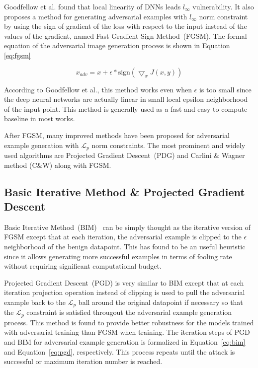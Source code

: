 Goodfellow et al.\cite{goodfellow2014explaining} found that local linearity of DNNs leads \(l_\infty\) vulnerability. It also proposes a method for generating adversarial examples with \(l_\infty\) norm constraint by using the sign of gradient of the loss with respect to the input instead of the values of the gradient, named Fast Gradient Sign Method~(FGSM). The formal equation of the adversarial image generation process is shown in Equation \ref{eq:fgsm}

\begin{equation}
    \label{eq:fgsm}
    x_{adv} = x + \epsilon * \text{sign}(\bigtriangledown_{x}J(x,y))
\end{equation}

According to Goodfellow et al., this method works even when \(\epsilon\) is too small since the deep neural networks are actually linear in small local epsilon neighborhood of the input point. This method is generally used as a fast and easy to compute baseline in most works.

After FGSM, many improved methods have been proposed for adversarial example generation with \(\mathcal{L}_p\) norm constraints. The most prominent and widely used algorithms are Projected Gradient Descent~(PDG) and Carlini \& Wagner method (C\&W) along with FGSM.

\subsection{Basic Iterative Method \& Projected Gradient Descent}
Basic Iterative Method~(BIM)~\cite{kurakin2018adversarialphys} can be simply thought as the iterative version of FGSM except that at each iteration, the adversarial example is clipped to the \(\epsilon\) neighborhood of the benign datapoint. This has found to be an useful heuristic since it allows generating more successful examples in terms of fooling rate without requiring significant computational budget.

Projected Gradient Descent~(PGD) \cite{madry2017towards} is very similar to BIM except that at each iteration projection operation instead of clipping is used to pull the adversarial example back to the \(\mathcal{L}_p\) ball around the original datapoint if necessary so that the \(\mathcal{L}_p\) constraint is satisfied througout the adversarial example generation process. This method is found to provide better robustness for the models trained with adversarial training than FGSM when training. The iteration steps of PGD and BIM for adversarial example generation is formalized in Equation~\ref{eq:bim} and Equation~\ref{eq:pgd}, respectively. This process repeats until the attack is successful or maximum iteration number is reached.

